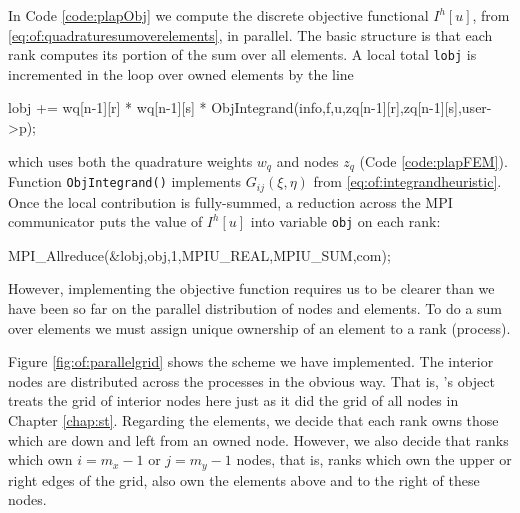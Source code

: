 
In Code \ref{code:plapObj} we compute the discrete objective functional $I^h[u]$, from \eqref{eq:of:quadraturesumoverelements}, in parallel.  The basic structure is that each rank computes its portion of the sum over all elements.  A local total \texttt{lobj} is incremented in the loop over owned elements by the line
\begin{code}
    lobj += wq[n-1][r] * wq[n-1][s] * ObjIntegrand(info,f,u,zq[n-1][r],zq[n-1][s],user->p);
\end{code}
which uses both the quadrature weights $w_q$ and nodes $z_q$ (Code \ref{code:plapFEM}).  Function \texttt{ObjIntegrand()} implements $G_{ij}(\xi,\eta)$ from \eqref{eq:of:integrandheuristic}.  Once the local contribution is fully-summed, a reduction across the MPI communicator puts the value of $I^h[u]$ into variable \texttt{obj} on each rank:
\begin{code}
    MPI_Allreduce(&lobj,obj,1,MPIU_REAL,MPIU_SUM,com);
\end{code}

However, implementing the objective function requires us to be clearer than we have been so far on the parallel distribution of nodes and elements.  To do a sum over elements we must assign unique ownership of an element to a rank (process).



Figure \ref{fig:of:parallelgrid} shows the scheme we have implemented.  The interior nodes are distributed across the processes in the obvious way.  That is, \PETSc's \pDMDA object treats the grid of interior nodes here just as it did the grid of all nodes in Chapter \ref{chap:st}.  Regarding the elements, we decide that each rank owns those which are down and left from an owned node.  However, we also decide that ranks which own $i=m_x-1$ or $j=m_y-1$ nodes, that is, ranks which own the upper or right edges of the grid, also own the elements above and to the right of these nodes.



